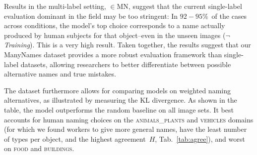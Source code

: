 Results in the multi-label setting, $\in$MN, suggest that the current single-label evaluation dominant in the field may be too stringent: In \mbox{$92-95\%$}\ of the cases across conditions, the model's top choice corresponds to a name actually produced by human subjects for that object--even in the unseen images (\mbox{$\neg$\textit{Training}}).
This is a very high result.
Taken together, the results suggest that our ManyNames dataset provides a more robust evaluation framework than single-label datasets, allowing researchers to better differentiate between possible alternative names and true mistakes.

The dataset furthermore allows for comparing models on weighted naming alternatives, as illustrated by measuring the KL divergence. 
As shown in the table, the model outperforms the random baseline on all image sets. 
It best accounts for human naming choices on the \textsc{animals\_plants} and \textsc{vehicles} domains (for which we found workers to give more general names, have the least number of types per object, and the highest agreement\ $H$, Tab.\ \ref{tab:agree}), and worst on \textsc{food} and \textsc{buildings}.

